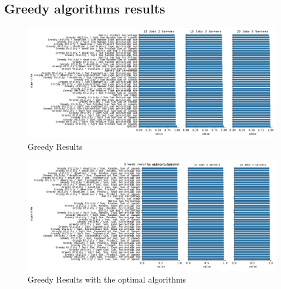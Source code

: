 \subsection{Greedy algorithms results}\label{subsec:greedy-algorithms-results}
\begin{figure}
\centering
        \includegraphics[width=1\linewidth, height=5cm]{./images/optimal_greedy_results.png}
    \caption{Greedy Results}
\end{figure}
\begin{figure}
\centering
        \includegraphics[width=1\linewidth, height=5cm]{./images/no_optimal_greedy_results.png}
    \caption{Greedy Results with the optimal algorithms}
\end{figure}